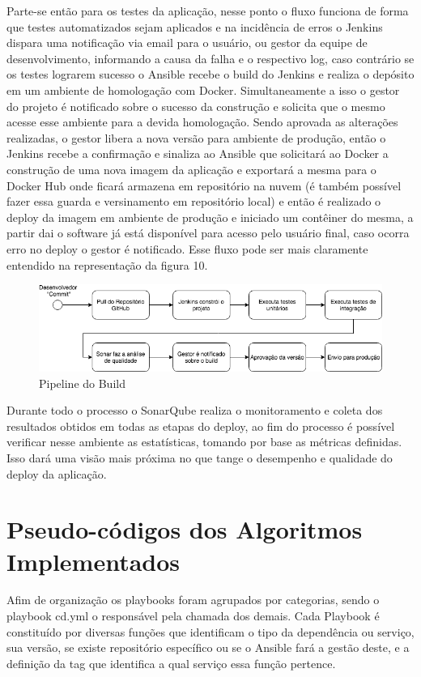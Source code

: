 Parte-se então para os testes da aplicação, nesse ponto o fluxo funciona de forma que testes automatizados sejam aplicados e na incidência de erros o Jenkins dispara uma notificação via email para o usuário, ou gestor da equipe de desenvolvimento, informando a causa da falha e o respectivo log, caso contrário se os testes lograrem sucesso o Ansible recebe o build do Jenkins e realiza o depósito em um ambiente de homologação com Docker. Simultaneamente a isso o gestor do projeto é notificado sobre o sucesso da construção e solicita que o mesmo acesse esse ambiente para a devida homologação. Sendo aprovada as alterações realizadas, o gestor libera a nova versão para ambiente de produção, então o Jenkins recebe a confirmação e sinaliza ao Ansible que solicitará ao Docker a construção de uma nova imagem da aplicação e exportará a mesma para o Docker Hub onde ficará armazena em repositório na nuvem (é também possível fazer essa guarda e versinamento em repositório local) e então é realizado o deploy da imagem em ambiente de produção e iniciado um contêiner do mesma, a partir dai o software já está disponível para acesso pelo usuário final, caso ocorra erro no deploy o gestor é notificado. Esse fluxo pode ser mais claramente entendido na representação da figura 10.

\begin{figure}[htb]
	\centering
	\includegraphics[width=1\linewidth]{imagens/pipelinebuild}
	\caption{Pipeline do Build}
	\label{fig:pipelinebuild}
\end{figure}


Durante todo o processo o SonarQube realiza o monitoramento e coleta dos resultados obtidos em todas as etapas do deploy, ao fim do processo é possível verificar nesse ambiente as estatísticas, tomando por base as métricas definidas. Isso dará uma visão mais próxima no que tange o desempenho e qualidade do deploy da aplicação.

\section{Pseudo-códigos dos Algoritmos Implementados}

Afim de organização os playbooks foram agrupados por categorias, sendo o playbook cd.yml o responsável pela chamada dos demais. Cada Playbook é constituído por diversas funções que identificam o tipo da dependência ou serviço, sua versão, se existe repositório específico ou se o Ansible fará a gestão deste, e a definição da tag que identifica a qual serviço essa função pertence.


